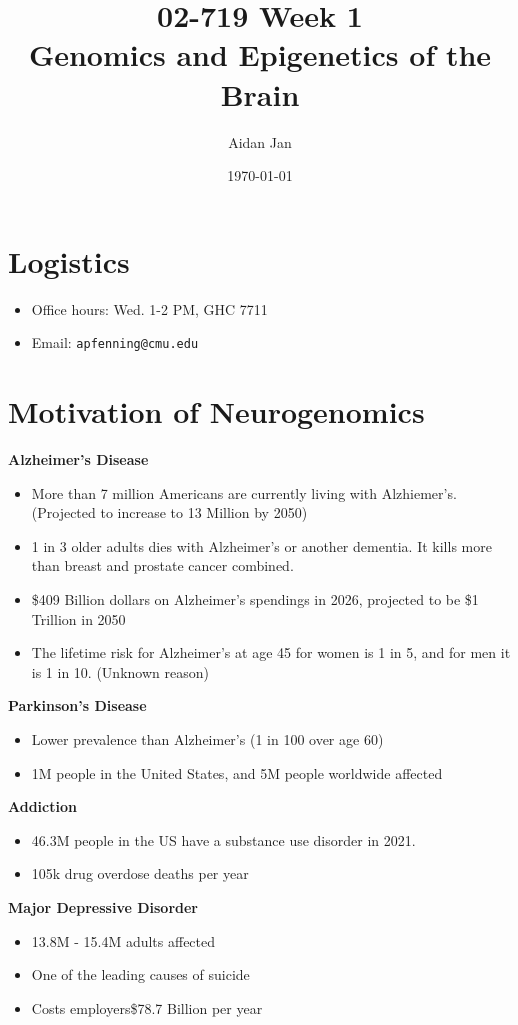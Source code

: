 \documentclass[10pt]{article}
\title{02-719 Week 1 \\ \large{Genomics and Epigenetics of the Brain}}
\author{Aidan Jan}
\date{\today}
\begin{document}
\maketitle

\section*{Logistics}
\begin{itemize}
	\item Office hours: Wed. 1-2 PM, GHC 7711
	\item Email: \texttt{apfenning@cmu.edu}
\end{itemize}

\section*{Motivation of Neurogenomics}
\textbf{Alzheimer's Disease}
\begin{itemize}
	\item More than 7 million Americans are currently living with Alzhiemer's.  (Projected to increase to 13 Million by 2050)
	\item 1 in 3 older adults dies with Alzheimer's or another dementia.  It kills more than breast and prostate cancer combined.
	\item \$409 Billion dollars on Alzheimer's spendings in 2026, projected to be \$1 Trillion in 2050
	\item The lifetime risk for Alzheimer's at age 45 for women is 1 in 5, and for men it is 1 in 10.  (Unknown reason)
\end{itemize}
\textbf{Parkinson's Disease}
\begin{itemize}
	\item Lower prevalence than Alzheimer's (1 in 100 over age 60)
	\item 1M people in the United States, and 5M people worldwide affected
\end{itemize}
\textbf{Addiction}
\begin{itemize}
	\item 46.3M people in the US have a substance use disorder in 2021.
	\item 105k drug overdose deaths per year
\end{itemize}
\textbf{Major Depressive Disorder}
\begin{itemize}
	\item 13.8M - 15.4M adults affected
	\item One of the leading causes of suicide
	\item Costs employers\$78.7 Billion per year
\end{itemize}
\end{document}
